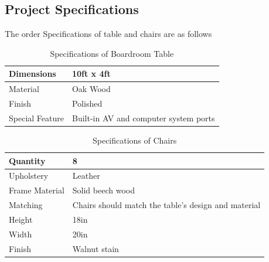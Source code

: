 \subsection{Project Specifications}
The order Specifications of table and chairs are as follows
\begin{table}[!h]
    \centering
    \begin{tabular}{|l|l|}
        \hline
        Dimensions      & 10ft x 4ft                            \\ \hline
        Material        & Oak Wood                              \\ \hline
        Finish          & Polished                              \\ \hline
        Special Feature & Built-in AV and computer system ports \\ \hline
    \end{tabular}
    \caption{Specifications of Boardroom Table}
    \label{table:table_specifications}
\end{table}

\begin{table}[!h]
    \centering
    \begin{tabular}{|l|l|}
        \hline
        Quantity       & 8                                                   \\ \hline
        Upholstery     & Leather                                             \\ \hline
        Frame Material & Solid beech wood                                    \\ \hline
        Matching       & Chairs should match the table's design and material \\ \hline
        Height         & 18in                                                \\ \hline
        Width          & 20in                                                \\ \hline
        Finish         & Walnut stain                                        \\ \hline
    \end{tabular}
    \caption{Specifications of Chairs}
    \label{table:Chairs_specifications}
\end{table}
\newpage
